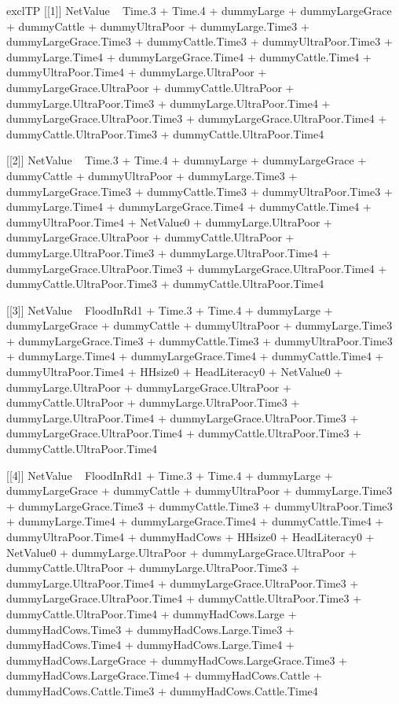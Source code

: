 \begin{Schunk}
\begin{Soutput}
[1] exclTP
[[1]]
NetValue ~ Time.3 + Time.4 + dummyLarge + dummyLargeGrace + dummyCattle + 
    dummyUltraPoor + dummyLarge.Time3 + dummyLargeGrace.Time3 + 
    dummyCattle.Time3 + dummyUltraPoor.Time3 + dummyLarge.Time4 + 
    dummyLargeGrace.Time4 + dummyCattle.Time4 + dummyUltraPoor.Time4 + 
    dummyLarge.UltraPoor + dummyLargeGrace.UltraPoor + dummyCattle.UltraPoor + 
    dummyLarge.UltraPoor.Time3 + dummyLarge.UltraPoor.Time4 + 
    dummyLargeGrace.UltraPoor.Time3 + dummyLargeGrace.UltraPoor.Time4 + 
    dummyCattle.UltraPoor.Time3 + dummyCattle.UltraPoor.Time4

[[2]]
NetValue ~ Time.3 + Time.4 + dummyLarge + dummyLargeGrace + dummyCattle + 
    dummyUltraPoor + dummyLarge.Time3 + dummyLargeGrace.Time3 + 
    dummyCattle.Time3 + dummyUltraPoor.Time3 + dummyLarge.Time4 + 
    dummyLargeGrace.Time4 + dummyCattle.Time4 + dummyUltraPoor.Time4 + 
    NetValue0 + dummyLarge.UltraPoor + dummyLargeGrace.UltraPoor + 
    dummyCattle.UltraPoor + dummyLarge.UltraPoor.Time3 + dummyLarge.UltraPoor.Time4 + 
    dummyLargeGrace.UltraPoor.Time3 + dummyLargeGrace.UltraPoor.Time4 + 
    dummyCattle.UltraPoor.Time3 + dummyCattle.UltraPoor.Time4

[[3]]
NetValue ~ FloodInRd1 + Time.3 + Time.4 + dummyLarge + dummyLargeGrace + 
    dummyCattle + dummyUltraPoor + dummyLarge.Time3 + dummyLargeGrace.Time3 + 
    dummyCattle.Time3 + dummyUltraPoor.Time3 + dummyLarge.Time4 + 
    dummyLargeGrace.Time4 + dummyCattle.Time4 + dummyUltraPoor.Time4 + 
    HHsize0 + HeadLiteracy0 + NetValue0 + dummyLarge.UltraPoor + 
    dummyLargeGrace.UltraPoor + dummyCattle.UltraPoor + dummyLarge.UltraPoor.Time3 + 
    dummyLarge.UltraPoor.Time4 + dummyLargeGrace.UltraPoor.Time3 + 
    dummyLargeGrace.UltraPoor.Time4 + dummyCattle.UltraPoor.Time3 + 
    dummyCattle.UltraPoor.Time4

[[4]]
NetValue ~ FloodInRd1 + Time.3 + Time.4 + dummyLarge + dummyLargeGrace + 
    dummyCattle + dummyUltraPoor + dummyLarge.Time3 + dummyLargeGrace.Time3 + 
    dummyCattle.Time3 + dummyUltraPoor.Time3 + dummyLarge.Time4 + 
    dummyLargeGrace.Time4 + dummyCattle.Time4 + dummyUltraPoor.Time4 + 
    dummyHadCows + HHsize0 + HeadLiteracy0 + NetValue0 + dummyLarge.UltraPoor + 
    dummyLargeGrace.UltraPoor + dummyCattle.UltraPoor + dummyLarge.UltraPoor.Time3 + 
    dummyLarge.UltraPoor.Time4 + dummyLargeGrace.UltraPoor.Time3 + 
    dummyLargeGrace.UltraPoor.Time4 + dummyCattle.UltraPoor.Time3 + 
    dummyCattle.UltraPoor.Time4 + dummyHadCows.Large + dummyHadCows.Time3 + 
    dummyHadCows.Large.Time3 + dummyHadCows.Time4 + dummyHadCows.Large.Time4 + 
    dummyHadCows.LargeGrace + dummyHadCows.LargeGrace.Time3 + 
    dummyHadCows.LargeGrace.Time4 + dummyHadCows.Cattle + dummyHadCows.Cattle.Time3 + 
    dummyHadCows.Cattle.Time4


\end{Soutput}
\end{Schunk}
